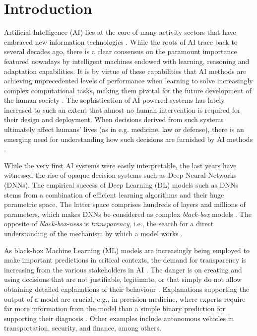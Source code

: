 \documentclass[final]{elsarticle}
\begin{document}

\section{Introduction} \label{sec:intro}

Artificial Intelligence (AI) lies at the core of many activity sectors that have embraced new information technologies \cite{russell2016artificial}. While the roots of AI trace back to several decades ago, there is a clear consensus on the paramount importance featured nowadays by intelligent machines endowed with learning, reasoning and adaptation capabilities. It is by virtue of these capabilities that AI methods are achieving unprecedented levels of performance when learning to solve increasingly complex computational tasks, making them pivotal for the future development of the human society \cite{west2018future}. The sophistication of AI-powered systems has lately increased to such an extent that almost no human intervention is required for their design and deployment. When decisions derived from such systems ultimately affect humans' lives (as in e.g. medicine, law or defense), there is an emerging need for understanding how such decisions are furnished by AI methods \cite{goodman2017Fair}.
 
While the very first AI systems were easily interpretable, the last years have witnessed the rise of opaque decision systems such as Deep Neural Networks (DNNs). The empirical success of Deep Learning (DL) models such as DNNs stems from a combination of efficient learning algorithms and their huge parametric space. The latter space comprises hundreds of layers and millions of parameters, which makes DNNs be considered as complex \textit{black-box} models \cite{Castelvecchi16}. The opposite of \textit{black-box-ness} is \textit{transparency}, i.e., the search for a direct understanding of the mechanism by which a model works \cite{Lipton18}.

As black-box Machine Learning (ML) models are increasingly being employed to make important predictions in critical contexts, the demand for transparency is increasing from the various stakeholders in AI \cite{Preece18Stakeholders}. The danger is on creating and using decisions that are not justifiable, legitimate, or that simply do not allow obtaining detailed explanations of their behaviour \cite{gunning2017explainable}. Explanations supporting the output of a model are crucial, e.g., in precision medicine, where experts require far more information from the model than a simple binary prediction for supporting their diagnosis \cite{1907.07374}. Other examples include autonomous vehicles in transportation, security, and finance, among others. 
\end{document}

